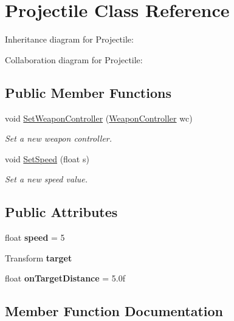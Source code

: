\hypertarget{class_projectile}{}\section{Projectile Class Reference}
\label{class_projectile}


Inheritance diagram for Projectile\+:


Collaboration diagram for Projectile\+:
\subsection*{Public Member Functions}
\begin{DoxyCompactItemize}
\item 
void \mbox{\hyperlink{class_projectile_aa970af64aceeb97c400baf2641959255}{Set\+Weapon\+Controller}} (\mbox{\hyperlink{class_weapon_controller}{Weapon\+Controller}} wc)
\begin{DoxyCompactList}\small\item\em Set a new weapon controller. \end{DoxyCompactList}\item 
void \mbox{\hyperlink{class_projectile_a60cfef3d08ba24bcb0663ca8f15e201c}{Set\+Speed}} (float s)
\begin{DoxyCompactList}\small\item\em Set a new speed value. \end{DoxyCompactList}\end{DoxyCompactItemize}
\subsection*{Public Attributes}
\begin{DoxyCompactItemize}
\item 
\mbox{\label{class_projectile_a08b05673dcd2da844c04ad812f04b3aa}} 
float {\bfseries speed} = 5
\item 
\mbox{\label{class_projectile_a158c4e21385fa618230014ba575bcce4}} 
Transform {\bfseries target}
\item 
\mbox{\label{class_projectile_a4596d92f9f87914e71e586be061cc980}} 
float {\bfseries on\+Target\+Distance} = 5.\+0f
\end{DoxyCompactItemize}


\subsection{Member Function Documentation}
\mbox{\label{class_projectile_a60cfef3d08ba24bcb0663ca8f15e201c}} 
